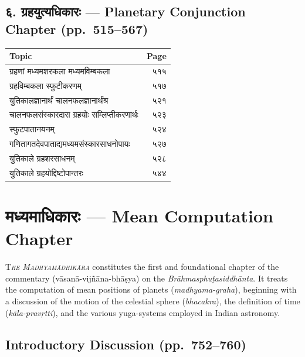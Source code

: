 \documentclass[11pt,a4paper]{article}
\newcommand{\dev}[1]{{\devanagarifont #1}}
\newcommand{\ditem}[1]{{\devanagarifont #1}}
\newcommand{\dhead}[1]{{\devanagarifont\textbf{#1}}}
\begin{document}
\subsection*{\dev{६. ग्रहयुत्यधिकारः} --- Planetary Conjunction Chapter (pp.\ 515--567)}

\begin{center}
\begin{tabular}{@{}l@{\hspace{2em}}r@{}}
\toprule
\dhead{Topic} & \dhead{Page} \\
\midrule
\ditem{ग्रहणां मध्यमशरकला मध्यमविम्बकला} & ५१५ \\
\ditem{ग्रहविम्बकला स्फुटीकरणम्} & ५१७ \\
\ditem{युतिकालज्ञानार्थं चालनफलज्ञानार्थंश्र} & ५२१ \\
\ditem{चालनफलसंस्कारदारा ग्रहयोः सम्लिप्तीकरणार्थः} & ५२३ \\
\ditem{स्फुटपातानयनम्} & ५२४ \\
\ditem{गणितागतदेवपाताद्यमध्यमसंस्कारसाधनोपायः} & ५२७ \\
\ditem{युतिकाले ग्रहशरसाधनम्} & ५२८ \\
\ditem{युतिकाले ग्रहयोद्दिष्टोपान्तरः} & ५४४ \\
\bottomrule
\end{tabular}
\end{center}

\newpage

\section*{\dev{मध्यमाधिकारः} --- Mean Computation Chapter}

\lettrine[lines=3,loversize=0.1]{T}{\textit{he Madhyamādhikāra}} constitutes the first and foundational chapter of the commentary (vāsanā-vijñāna-bhāṣya) on the \textit{Brāhmasphuṭasiddhānta}. It treats the computation of mean positions of planets (\textit{madhyama-graha}), beginning with a discussion of the motion of the celestial sphere (\textit{bhacakra}), the definition of time (\textit{kāla-pravṛtti}), and the various yuga-systems employed in Indian astronomy.

\subsection*{Introductory Discussion (pp.\ 752--760)}
\end{document}
